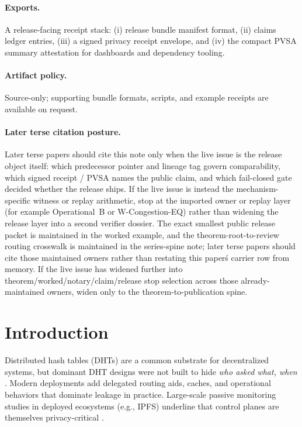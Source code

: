 \documentclass[11pt]{article}
\begin{document}
\paragraph{Exports.}
A release-facing receipt stack: (i) release bundle manifest format, (ii) claims ledger entries,
(iii) a signed privacy receipt envelope, and (iv) the compact PVSA summary attestation for dashboards and dependency tooling.

\paragraph{Artifact policy.}
Source-only; supporting bundle formats, scripts, and example receipts are available on request.\cite{series:artifactpolicy}

\paragraph{Later terse citation posture.} Later terse papers should cite this note only when the live issue is the release object itself: which predecessor pointer and lineage tag govern comparability, which signed receipt / PVSA names the public claim, and which fail-closed gate decided whether the release ships. If the live issue is instead the mechanism-specific witness or replay arithmetic, stop at the imported owner or replay layer (for example Operational~B or W-Congestion-EQ) rather than widening the release layer into a second verifier dossier. The exact smallest public release packet is maintained in the worked example, and the theorem-root-to-review routing crosswalk is maintained in the series-spine note; later terse papers should cite those maintained owners rather than restating this paper\'s carrier row from memory. If the live issue has widened further into theorem/worked/notary/claim/release stop selection across those already-maintained owners, widen only to the theorem-to-publication spine.\cite{series:proofcarryingbudgets,series:wcongeq,series:workedexample,series:seriesspines,series:theoremtopublicationspine}

\section{Introduction}
Distributed hash tables (DHTs) are a common substrate for decentralized systems, but dominant DHT designs were not built to hide \emph{who asked what, when} \cite{kademlia2002}.
Modern deployments add delegated routing aids, caches, and operational behaviors that dominate leakage in practice.
Large-scale passive monitoring studies in deployed ecosystems (e.g., IPFS) underline that control planes are themselves privacy-critical \cite{balduf_ipfs_monitoring}.
\end{document}

